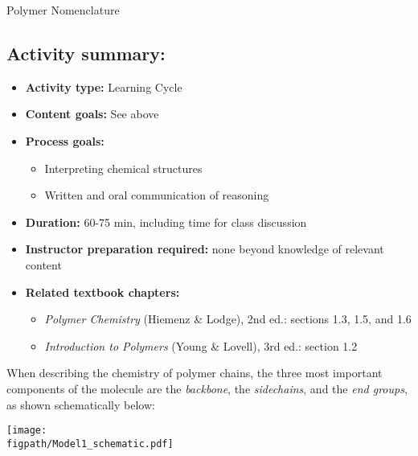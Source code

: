 \begin{activity}{Polymer Nomenclature}
\begin{instructornotes}
	\subsection*{Activity summary:}
	\begin{itemize}
		\item \textbf{Activity type:} Learning Cycle
		\item \textbf{Content goals:} See above
		\item \textbf{Process goals:} %
			\begin{itemize}
				\item Interpreting chemical structures
				\item Written and oral communication of reasoning
			\end{itemize}
		\item \textbf{Duration:} 60-75 min, including time for class discussion
		\item \textbf{Instructor preparation required:} none beyond knowledge of relevant content
		\item \textbf{Related textbook chapters:}
			\begin{itemize}
				\item \emph{Polymer Chemistry} (Hiemenz \& Lodge), 2nd ed.: sections 1.3, 1.5, and 1.6
				\item \emph{Introduction to Polymers} (Young \& Lovell), 3rd ed.: section 1.2
			\end{itemize}
	\end{itemize}

\end{instructornotes}


\begin{model}
\label{\labelbase:mdl:backsideend}

	When describing the chemistry of polymer chains, the three most important components of the molecule are the \emph{backbone}, the \emph{sidechains}, and the \emph{end groups}, as shown schematically below:
	
	\centerline{\texttt{[image: \\figpath/Model1\_schematic.pdf]}}


\end{model}
\end{activity}
